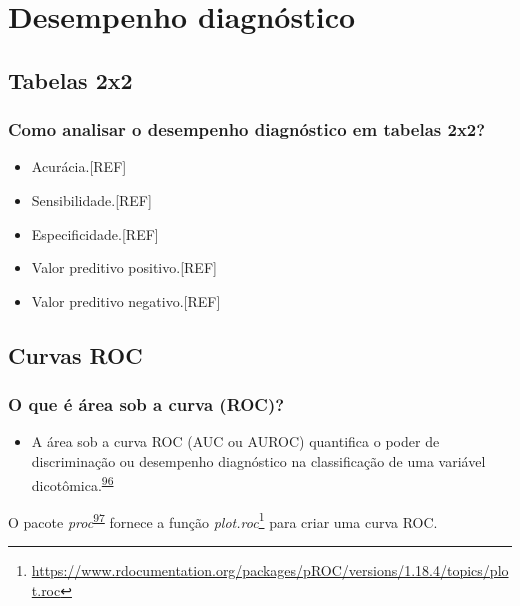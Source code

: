 \documentclass[
]{book}
\providecommand{\tightlist}{%
  \setlength{\itemsep}{0pt}\setlength{\parskip}{0pt}}
\renewcommand{\href}[2]{#2\footnote{\url{#1}}}
\newenvironment{infobox}[1]
  {
  \begin{itemize}
  \renewcommand{\labelitemi}{
    \raisebox{-.7\height}[0pt][0pt]{
      {\setkeys{Gin}{width=3em,keepaspectratio}
        \texttt{[image: \#1]}}
    }
  }
  \setlength{\fboxsep}{1em}
  \begin{blackbox}
  \item
  }
  {
  \end{blackbox}
  \end{itemize}
  }
\begin{document}
\hypertarget{analise-desempenho-diagnostico}{%
\chapter{\texorpdfstring{\textbf{Desempenho diagnóstico}}{Desempenho diagnóstico}}\label{analise-desempenho-diagnostico}}

\hypertarget{tabelas-2x2}{%
\section{Tabelas 2x2}\label{tabelas-2x2}}

\hypertarget{como-analisar-o-desempenho-diagnuxf3stico-em-tabelas-2x2}{%
\subsection{Como analisar o desempenho diagnóstico em tabelas 2x2?}\label{como-analisar-o-desempenho-diagnuxf3stico-em-tabelas-2x2}}

\begin{itemize}
\item
  Acurácia.{[}REF{]}
\item
  Sensibilidade.{[}REF{]}
\item
  Especificidade.{[}REF{]}
\item
  Valor preditivo positivo.{[}REF{]}
\item
  Valor preditivo negativo.{[}REF{]}
\end{itemize}

\hypertarget{curvas-roc}{%
\section{Curvas ROC}\label{curvas-roc}}

\hypertarget{o-que-uxe9-uxe1rea-sob-a-curva-roc}{%
\subsection{O que é área sob a curva (ROC)?}\label{o-que-uxe9-uxe1rea-sob-a-curva-roc}}

\begin{itemize}
\tightlist
\item
  A área sob a curva ROC (AUC ou AUROC) quantifica o poder de discriminação ou desempenho diagnóstico na classificação de uma variável dicotômica.\textsuperscript{\protect\hyperlink{ref-de2022}{96}}
\end{itemize}

\begin{infobox}{images/Rlogo}
O pacote \emph{proc}\textsuperscript{\protect\hyperlink{ref-pROC}{97}} fornece a função \href{https://www.rdocumentation.org/packages/pROC/versions/1.18.4/topics/plot.roc}{\emph{plot.roc}} para criar uma curva ROC.

\end{infobox}
\end{document}
